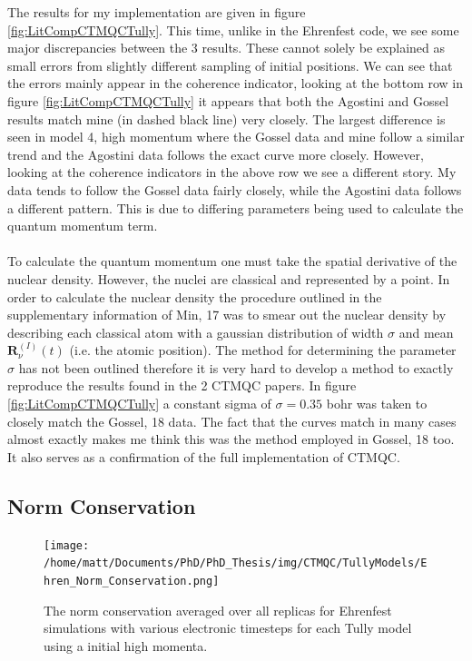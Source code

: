 The results for my implementation are given in figure \ref{fig:LitCompCTMQCTully}. This time, unlike in the Ehrenfest code, we see some major discrepancies between the 3 results. These cannot solely be explained as small errors from slightly different sampling of initial positions. We can see that the errors mainly appear in the coherence indicator, looking at the bottom row in figure \ref{fig:LitCompCTMQCTully} it appears that both the Agostini and Gossel results match mine (in dashed black line) very closely. The largest difference is seen in model 4, high momentum where the Gossel data and mine follow a similar trend and the Agostini data follows the exact curve more closely. However, looking at the coherence indicators in the above row we see a different story. My data tends to follow the Gossel data fairly closely, while the Agostini data follows a different pattern. This is due to differing parameters being used to calculate the quantum momentum term.
\\\\
To calculate the quantum momentum one must take the spatial derivative of the nuclear density. However, the nuclei are classical and represented by a point. In order to calculate the nuclear density the procedure outlined in the supplementary information of Min, 17 \cite{min_ab_2017} was to smear out the nuclear density by describing each classical atom with a gaussian distribution of width $\sigma$ and mean $\mathbf{R}^{(I)}_{\nu}(t)$ (i.e. the atomic position). The method for determining the parameter $\sigma$ has not been outlined therefore it is very hard to develop a method to exactly reproduce the results found in the 2 CTMQC papers. In figure \ref{fig:LitCompCTMQCTully} a constant sigma of $\sigma = 0.35$ bohr was taken to closely match the Gossel, 18 data. The fact that the curves match in many cases almost exactly makes me think this was the method employed in Gossel, 18 too. It also serves as a confirmation of the full implementation of CTMQC.


\subsection{Norm Conservation}
\begin{figure}[h]
	\texttt{[image: /home/matt/Documents/PhD/PhD\_Thesis/img/CTMQC/TullyModels/Ehren\_Norm\_Conservation.png]}
	\caption{\label{fig:EhrenNormCons}The norm conservation averaged over all replicas for Ehrenfest simulations with various electronic timesteps for each Tully model using a initial high momenta.}
\end{figure}

